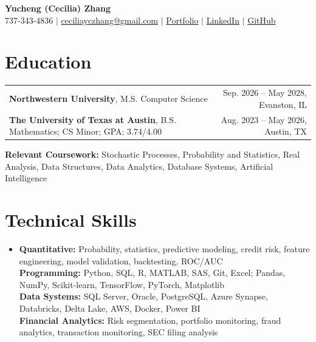 \documentclass[letterpaper,10pt]{article}
\begin{document}
\begin{center}
{\Large\textbf{Yucheng (Cecilia) Zhang}}\\[-1pt]
\small 737-343-4836 $|$ \href{mailto:ceciliayczhang@gmail.com}{ceciliayczhang@gmail.com} $|$
\href{https://yczhangcc.github.io/yuchengzhang_portfolio/}{Portfolio} $|$
\href{https://www.linkedin.com/in/yczcecilia/}{LinkedIn} $|$
\href{https://github.com/yczhangcc}{GitHub}
\end{center}
\vspace{-8pt}

\section{Education}
{\small
\begin{tabular*}{0.985\textwidth}[t]{l@{\extracolsep{\fill}}r}
\textbf{Northwestern University}, M.S. Computer Science & Sep. 2026 -- May 2028, Evanston, IL \\
\textbf{The University of Texas at Austin}, B.S. Mathematics; CS Minor; GPA: 3.74/4.00 & Aug. 2023 -- May 2026, Austin, TX \\
\end{tabular*}}
\vspace{-2pt}
\footnotesize{\textbf{Relevant Coursework:} Stochastic Processes, Probability and Statistics, Real Analysis, Data Structures, Data Analytics, Database Systems, Artificial Intelligence}
\vspace{-5pt}

\section{Technical Skills}
\begin{itemize}[leftmargin=0.11in,label={},topsep=1pt,itemsep=0pt]
\footnotesize\item{
\textbf{Quantitative:} Probability, statistics, predictive modeling, credit risk, feature engineering, model validation, backtesting, ROC/AUC \\
\textbf{Programming:} Python, SQL, R, MATLAB, SAS, Git, Excel; Pandas, NumPy, Scikit-learn, TensorFlow, PyTorch, Matplotlib \\
\textbf{Data Systems:} SQL Server, Oracle, PostgreSQL, Azure Synapse, Databricks, Delta Lake, AWS, Docker, Power BI \\
\textbf{Financial Analytics:} Risk segmentation, portfolio monitoring, fraud analytics, transaction monitoring, SEC filing analysis
}
\end{itemize}
\vspace{-7pt}
\end{document}
